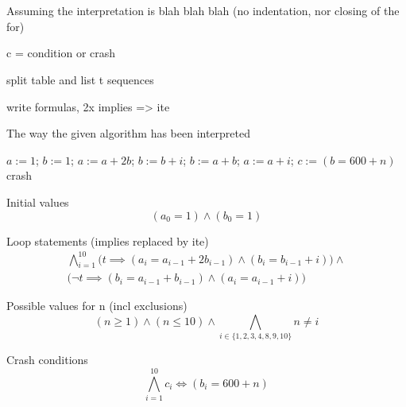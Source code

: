 \chapter{}
Assuming the interpretation is blah blah blah (no indentation, nor closing of the for)

c = condition or crash

split table and list t sequences 

write formulas, 2x implies => ite

\begin{algorithm}
  \caption{The way the given algorithm has been interpreted}
  \label{alg:4_improved}
  \begin{algorithmic}[1]
    \State $a := 1$;
    \State $b := 1$;
        \State $a := a + 2b$;
        \State $b := b + i$;
      \Else
        \State $b := a + b$;
        \State $a := a + i$;
      \EndIf
      \State $c := (b = 600 + n)$
        \State crash
      \EndIf
    \EndFor
  \end{algorithmic}
\end{algorithm}

Initial values
\begin{equation}
  \label{eqn:4_initial}
  (a_{0} = 1) \wedge (b_{0} = 1)
\end{equation}

Loop statements (implies replaced by ite)
\begin{equation}
  \label{eqn:4_loop}
  \begin{aligned}
    \bigwedge_{i = 1}^{10}
      \Big(t \implies (a_{i} = a_{i - 1} + 2b_{i - 1}) \wedge (b_{i} = b_{i - 1} + i)\Big) \wedge \\
      \Big(\neg t \implies (b_{i} = a_{i - 1} + b_{i - 1}) \wedge (a_{i} = a_{i - 1} + i)\Big)
    \end{aligned}
\end{equation}

Possible values for n (incl exclusions)
\begin{equation}
  \label{eqn:4_valn}
  (n \geq 1) \wedge (n \leq 10) \wedge
  \bigwedge_{i \in \{1, 2, 3, 4, 8, 9, 10\}} n \neq i
\end{equation}

Crash conditions
\begin{equation}
  \label{eqn:4_condcrash}
  \bigwedge_{i = 1}^{10}
    c_{i} \iff (b_{i} = 600 + n)
\end{equation}

